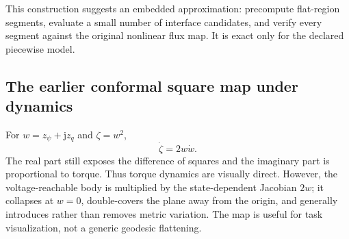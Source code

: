 

This construction suggests an embedded approximation: precompute flat-region
segments, evaluate a small number of interface candidates, and verify every
segment against the original nonlinear flux map.  It is exact only for the
declared piecewise model.

\subsection{The earlier conformal square map under dynamics}

For \(w=z_\psi+\mathrm jz_q\) and \(\zeta=w^2\),
\[
 \dot\zeta=2w\dot w.
 \tag{28.6}
\]
The real part still exposes the difference of squares and the imaginary part
is proportional to torque.  Thus torque dynamics are visually direct.
However, the voltage-reachable body is multiplied by the state-dependent
Jacobian \(2w\); it collapses at \(w=0\), double-covers the plane away from the
origin, and generally introduces rather than removes metric variation.  The
map is useful for task visualization, not a generic geodesic flattening.

